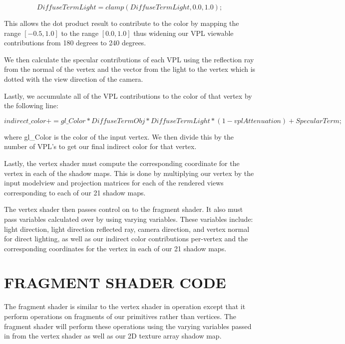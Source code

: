 \begin{equation}
DiffuseTermLight = clamp(DiffuseTermLight, 0.0, 1.0);
\end{equation}

This allows the dot product result to contribute to the color by mapping the range $[-0.5, 1.0]$ to the range $[0.0, 1.0]$ thus widening our VPL viewable contributions from 180 degrees to 240 degrees.

We then calculate the specular contributions of each VPL using the reflection ray from the normal of the vertex and the vector from the light to the vertex which is dotted with the view direction of the camera.

Lastly, we accumulate all of the VPL contributions to the color of that vertex by the following line:


\begin{dmath}
indirect\_color += gl\_Color*DiffuseTermObj*DiffuseTermLight
	*(1-vplAttenuation)+SpecularTerm;
\end{dmath}

where gl\_Color is the color of the input vertex.  We then divide this by the number of VPL's to get our final indirect color for that vertex.

Lastly, the vertex shader must compute the corresponding coordinate for the vertex in each of the shadow maps.  This is done by multiplying our vertex by the input modelview and projection matrices for each of the rendered views corresponding to each of our 21 shadow maps.

The vertex shader then passes control on to the fragment shader.  It also must pass variables calculated over by using varying variables.  These variables include: light direction, light direction reflected ray, camera direction, and vertex normal for direct lighting, as well as our indirect color contributions per-vertex and the corresponding coordinates for the vertex in each of our 21 shadow maps.

\section{FRAGMENT SHADER CODE}

The fragment shader is similar to the vertex shader in operation except that it perform operations on fragments of our primitives rather than vertices.  The fragment shader will perform these operations using the varying variables passed in from the vertex shader as well as our 2D texture array shadow map.

